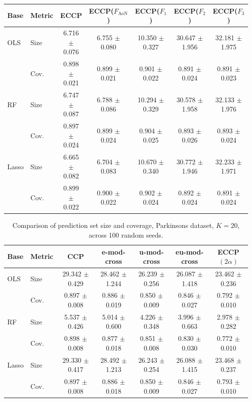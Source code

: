 \documentclass{article}
\theoremstyle{plain}
\theoremstyle{definition}
\theoremstyle{remark}
\begin{document}
\begin{table}[H]
\centering

\begin{tabular}{llccccc}
\toprule
Base & Metric & ECCP & ECCP($F_{\text{AoN}}$) & ECCP($F_1$) & ECCP($F_2$) & ECCP($F_3$) \\
\midrule
OLS & Size & 6.716 $\pm$ 0.076 & 6.755 $\pm$ 0.080 & 10.350 $\pm$ 0.327 & 30.647 $\pm$ 1.956 & 32.181 $\pm$ 1.975 \\
 & Cov. & 0.898 $\pm$ 0.021 & 0.899 $\pm$ 0.021 & 0.901 $\pm$ 0.022 & 0.891 $\pm$ 0.024 & 0.891 $\pm$ 0.023 \\
\midrule
RF & Size & 6.747 $\pm$ 0.087 & 6.788 $\pm$ 0.086 & 10.294 $\pm$ 0.329 & 30.578 $\pm$ 1.958 & 32.133 $\pm$ 1.976 \\
 & Cov. & 0.897 $\pm$ 0.024 & 0.899 $\pm$ 0.024 & 0.904 $\pm$ 0.025 & 0.893 $\pm$ 0.026 & 0.893 $\pm$ 0.024 \\
\midrule
Lasso & Size & 6.665 $\pm$ 0.082 & 6.704 $\pm$ 0.083 & 10.670 $\pm$ 0.340 & 30.772 $\pm$ 1.946 & 32.233 $\pm$ 1.971 \\
 & Cov. & 0.899 $\pm$ 0.022 & 0.900 $\pm$ 0.022 & 0.902 $\pm$ 0.024 & 0.892 $\pm$ 0.024 & 0.891 $\pm$ 0.024 \\
\bottomrule
\end{tabular}
\end{table}


\begin{table}[H]
\centering
\caption{Comparison of prediction set size and coverage, Parkinsons dataset, $K=20$, across 100 random seeds.}
\begin{tabular}{llccccc}
\toprule
Base & Metric & CCP & e-mod-cross & u-mod-cross & eu-mod-cross & ECCP$(2\alpha)$ \\
\midrule
OLS & Size & 29.342 $\pm$ 0.429 & 28.462 $\pm$ 1.244 & 26.239 $\pm$ 0.256 & 26.087 $\pm$ 1.418 & 23.462 $\pm$ 0.236 \\
 & Cov. & 0.897 $\pm$ 0.008 & 0.886 $\pm$ 0.019 & 0.850 $\pm$ 0.009 & 0.846 $\pm$ 0.027 & 0.792 $\pm$ 0.010 \\
\midrule
RF & Size & 5.537 $\pm$ 0.426 & 5.014 $\pm$ 0.600 & 4.226 $\pm$ 0.348 & 3.996 $\pm$ 0.663 & 2.978 $\pm$ 0.282 \\
 & Cov. & 0.898 $\pm$ 0.008 & 0.877 $\pm$ 0.018 & 0.851 $\pm$ 0.008 & 0.830 $\pm$ 0.030 & 0.772 $\pm$ 0.010 \\
\midrule
Lasso & Size & 29.330 $\pm$ 0.417 & 28.492 $\pm$ 1.213 & 26.243 $\pm$ 0.254 & 26.088 $\pm$ 1.415 & 23.468 $\pm$ 0.237 \\
 & Cov. & 0.897 $\pm$ 0.008 & 0.886 $\pm$ 0.018 & 0.850 $\pm$ 0.009 & 0.846 $\pm$ 0.027 & 0.793 $\pm$ 0.010 \\
\bottomrule
\end{tabular}
\end{table}
\end{document}

